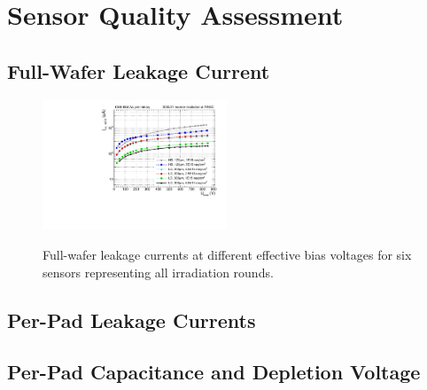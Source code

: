 \section{Sensor Quality Assessment}
\label{sec:QA}

\subsection{Full-Wafer Leakage Current}
\label{subsec:QA_Itot}

\begin{figure}[h]
	\centering
	\includegraphics[width=0.49\textwidth]{plots/total_iv/total_current_IV.pdf}
	\label{plot:tot_IV_good}
	\caption{
	Full-wafer leakage currents at different effective bias voltages for six sensors representing all irradiation rounds.
	}
\end{figure}

\subsection{Per-Pad Leakage Currents}
\label{subsec:QA_Ipad}

\subsection{Per-Pad Capacitance and Depletion Voltage}
\label{subsec:QA_Vdep}
